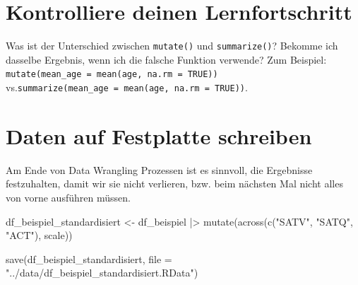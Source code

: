 \documentclass[
  letterpaper,
  DIV=11,
  numbers=noendperiod]{scrreprt}
\newenvironment{Shaded}{\begin{snugshade}}{\end{snugshade}}
\newcommand{\AttributeTok}[1]{\textcolor[rgb]{0.40,0.45,0.13}{#1}}
\newcommand{\FunctionTok}[1]{\textcolor[rgb]{0.28,0.35,0.67}{#1}}
\newcommand{\NormalTok}[1]{\textcolor[rgb]{0.00,0.23,0.31}{#1}}
\newcommand{\OtherTok}[1]{\textcolor[rgb]{0.00,0.23,0.31}{#1}}
\newcommand{\SpecialCharTok}[1]{\textcolor[rgb]{0.37,0.37,0.37}{#1}}
\newcommand{\StringTok}[1]{\textcolor[rgb]{0.13,0.47,0.30}{#1}}
\begin{document}
\section{Kontrolliere deinen
Lernfortschritt}\label{kontrolliere-deinen-lernfortschritt}

Was ist der Unterschied zwischen \texttt{mutate()} und
\texttt{summarize()}? Bekomme ich dasselbe Ergebnis, wenn ich die
falsche Funktion verwende? Zum Beispiel:
\texttt{mutate(mean\_age\ =\ mean(age,\ na.rm\ =\ TRUE))}
vs.\texttt{summarize(mean\_age\ =\ mean(age,\ na.rm\ =\ TRUE))}.

\section{Daten auf Festplatte
schreiben}\label{daten-auf-festplatte-schreiben}

Am Ende von Data Wrangling Prozessen ist es sinnvoll, die Ergebnisse
festzuhalten, damit wir sie nicht verlieren, bzw. beim nächsten Mal
nicht alles von vorne ausführen müssen.

\begin{Shaded}
\begin{Highlighting}[]
\NormalTok{df\_beispiel\_standardisiert }\OtherTok{\textless{}{-}}\NormalTok{ df\_beispiel }\SpecialCharTok{|\textgreater{}} \FunctionTok{mutate}\NormalTok{(}\FunctionTok{across}\NormalTok{(}\FunctionTok{c}\NormalTok{(}\StringTok{"SATV"}\NormalTok{, }\StringTok{"SATQ"}\NormalTok{, }\StringTok{"ACT"}\NormalTok{),}
\NormalTok{                                                           scale))}

\FunctionTok{save}\NormalTok{(df\_beispiel\_standardisiert, }\AttributeTok{file =}  \StringTok{"../data/df\_beispiel\_standardisiert.RData"}\NormalTok{)}
\end{Highlighting}
\end{Shaded}
\end{document}
